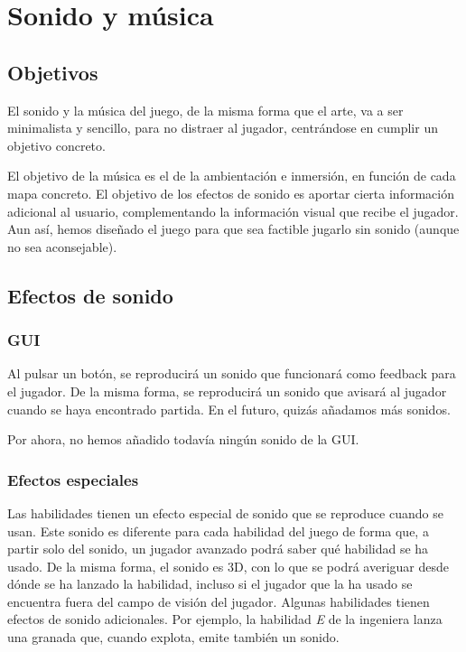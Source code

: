 \chapter{Sonido y música}


\section{Objetivos}

El sonido y la música del juego, de la misma forma que el arte, va a ser minimalista y sencillo, para no distraer al jugador, centrándose en cumplir un objetivo concreto. 

El objetivo de la música es el de la ambientación e inmersión, en función de cada mapa concreto. El objetivo de los efectos de sonido es aportar cierta información adicional al usuario, complementando la información visual que recibe el jugador. Aun así, hemos diseñado el juego para que sea factible jugarlo sin sonido (aunque no sea aconsejable).



\section{Efectos de sonido}
\subsection{GUI}
Al pulsar un botón, se reproducirá un sonido que funcionará como feedback para el jugador. De la misma forma, se reproducirá un sonido que avisará al jugador cuando se haya encontrado partida. En el futuro, quizás añadamos más sonidos.

Por ahora, no hemos añadido todavía ningún sonido de la GUI.
	
\subsection{Efectos especiales}
Las habilidades tienen un efecto especial de sonido que se reproduce cuando se usan. Este sonido es diferente para cada habilidad del juego de forma que, a partir solo del sonido, un jugador avanzado podrá saber qué habilidad se ha usado. De la misma forma, el sonido es 3D, con lo que se podrá averiguar desde dónde se ha lanzado la habilidad, incluso si el jugador que la ha usado se encuentra fuera del campo de visión del jugador. Algunas habilidades tienen efectos de sonido adicionales. Por ejemplo, la habilidad \emph{E} de la ingeniera lanza una granada que, cuando explota, emite también un sonido.

